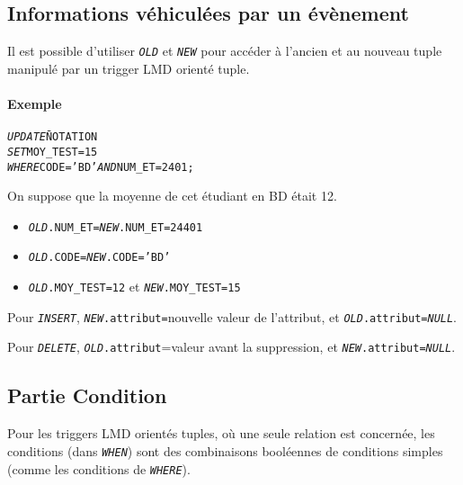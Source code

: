 \documentclass[10pt]{article}
\begin{document}
            \subsection{Informations véhiculées par un évènement}
                Il est possible d'utiliser \emph{\texttt{OLD}} et \emph{\texttt{NEW}} pour accéder à l'ancien et au nouveau tuple manipulé par un trigger LMD orienté tuple.

                \paragraph{Exemple}
                    \begin{alltt}
                        \begin{tabbing}
                            \emph{UPDATE}\=NOTATION\\
                            \emph{SET}\>MOY_TEST=15\\
                            \emph{WHERE}\>CODE='BD' \emph{AND} NUM_ET=2401;
                        \end{tabbing}
                    \end{alltt}

                On suppose que la moyenne de cet étudiant en BD était 12.
                \begin{itemize}
                    \item \emph{\texttt{OLD}}\texttt{.NUM\_ET=}\emph{\texttt{NEW}}\texttt{.NUM\_ET=24401}
                    \item \emph{\texttt{OLD}}\texttt{.CODE=}\emph{\texttt{NEW}}\texttt{.CODE='BD'}
                    \item \emph{\texttt{OLD}}\texttt{.MOY\_TEST=12} et \emph{\texttt{NEW}}\texttt{.MOY\_TEST=15}
                \end{itemize}

                Pour \emph{\texttt{INSERT}}, \emph{\texttt{NEW}}\texttt{.attribut=}nouvelle valeur de l'attribut, et \emph{\texttt{OLD}}\texttt{.attribut=}\emph{\texttt{NULL}}.

                Pour \emph{\texttt{DELETE}}, \emph{\texttt{OLD}}\texttt{.attribut}=valeur avant la suppression, et \emph{\texttt{NEW}}\texttt{.attribut=}\emph{\texttt{NULL}}.

            \subsection{Partie Condition}
                Pour les triggers LMD orientés tuples, où une seule relation est concernée, les conditions (dans \emph{\texttt{WHEN}}) sont des combinaisons booléennes de conditions simples (comme les conditions de \emph{\texttt{WHERE}}).
\end{document}
